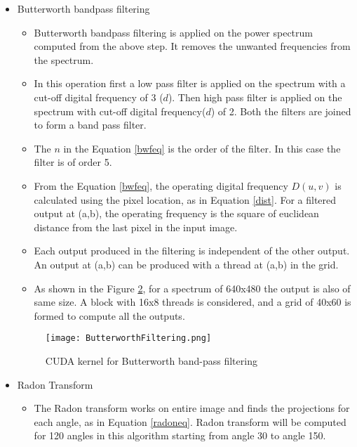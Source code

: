 \begin{itemize}
\begin{itemize}
\begin{figure}[h!]
		\centering
		\texttt{[image: powerSpectrumCalculation.png]}
		\caption{CUDA cufft library usage for calculating FFT}
		\label{fig:cufft}
\end{figure}
	\item the power spectrum calculation is explained in the Figure \ref{fig:cufft}. 
\end{itemize}
\item Butterworth bandpass filtering
\begin{itemize}
	\item Butterworth bandpass filtering is applied on the power spectrum computed from the above step. It removes the unwanted frequencies from the spectrum.
	\item In this operation first a low pass filter is applied on the spectrum with a cut-off digital frequency of 3 ($d$). Then high pass filter is applied on the spectrum with cut-off digital frequency($d$) of 2. Both the filters are joined to form a band pass filter.
	\item The $n$ in the Equation \ref{bwfeq} is the order of the filter. In this case the filter is of order 5.
	\item From the Equation \ref{bwfeq}, the operating digital frequency $D(u,v)$ is calculated using the pixel location, as in Equation \ref{dist}. For a filtered output at (a,b), the operating frequency is the square of euclidean distance from the last pixel in the input image.
	\item Each output produced in the filtering is independent of the other output. An output at (a,b) can be produced with a thread at (a,b) in the grid.
	\item As shown in the Figure \ref{fig:butterworth}, for a spectrum of 640x480 the output is also of same size. A block with 16x8 threads is considered, and a grid of 40x60 is formed to compute all the outputs.
\end{itemize}
\begin{figure}[h!]
	\centering
	\texttt{[image: ButterworthFiltering.png]}
	\caption{CUDA kernel for Butterworth band-pass filtering}
	\label{fig:butterworth}
\end{figure}
\item Radon Transform
\begin{itemize}
	\item The Radon transform works on entire image and finds the projections for each angle, as in Equation \ref{radoneq}. Radon transform will be computed for 120 angles in this algorithm starting from angle 30 to angle 150.

\end{itemize}
\end{itemize}
